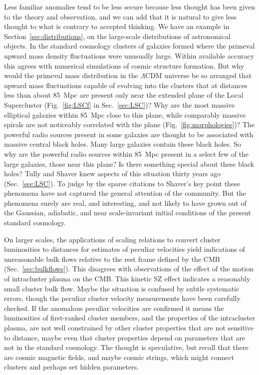 \documentclass[fleqn,12pt]{article}
\begin{document}
Less familiar anomalies tend to be less secure because less thought has been given to the theory and observation, and we can add that it is natural to give less thought to what is contrary to accepted thinking. We have an example in Section~\ref{sec:distributions}, on the large-scale distributions of astronomical objects. In the standard cosmology clusters of galaxies formed where the primeval upward mass density fluctuations were unusually large. Within available accuracy this agrees with numerical simulations of cosmic structure formation. But why would the primeval mass distribution in the $\Lambda$CDM universe be so arranged that upward mass fluctuations capable of evolving into the clusters that at distances less than about 85~Mpc are present only near the extended plane of the Local Supercluster (Fig.~\ref{fig:LSCf} in Sec.~\ref{sec:LSC})? Why are the most massive elliptical galaxies within 85~Mpc close to this plane, while comparably massive spirals are not noticeably correlated with the plane (Fig.~\ref{fig:morphologies})? The powerful radio sources present in some galaxies are thought to be associated with massive central black holes. Many large galaxies contain these black holes. So why are the powerful radio sources within 85~Mpc present in a select few of the large galaxies, those near this plane? Is there something special about these black holes? Tully and Shaver knew aspects of this situation thirty years ago (Sec.~\ref{sec:LSC}). To judge by the sparse citations to Shaver's key point these phenomena have not captured the general attention of the community. But the phenomena surely are real, and interesting, and not likely to have grown out of the Gaussian, adiabatic, and near scale-invariant initial conditions of the present standard cosmology. 

On larger scales, the applications of scaling relations to convert cluster luminosities to distances for estimates of peculiar velocities yield indications of unreasonable bulk flows relative to the rest frame defined by the CMB (Sec.~\ref{sec:bulkflows}). This disagrees with observations of the effect of the motion of intracluster plasma on the CMB. This kinetic SZ effect indicates a reasonably small cluster bulk flow. Maybe the situation is confused by subtle systematic errors, though the peculiar cluster velocity measurements  have been carefully checked. If the anomalous peculiar velocities are confirmed it means the luminosities of first-ranked cluster members, and the properties of the intracluster plasma, are not well constrained by other cluster properties that are not sensitive to distance, maybe even that cluster properties depend on parameters that are not in the standard cosmology. The thought is speculative, but recall that there are cosmic magnetic fields, and maybe cosmic strings, which might connect clusters and perhaps set hidden parameters.
\end{document}
